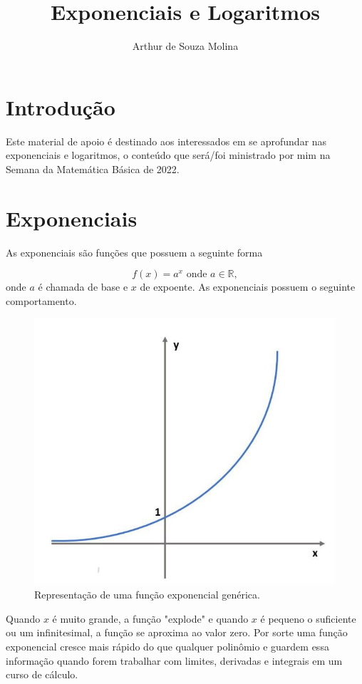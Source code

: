 \documentclass[10pt,a4paper]{article}
\title{Exponenciais e Logaritmos}
\author{Arthur de Souza Molina}
\begin{document}
	\maketitle
	\section{Introdução}
	Este material de apoio é destinado aos interessados em se aprofundar nas exponenciais e logaritmos, o conteúdo que será/foi ministrado por mim na Semana da Matemática Básica de 2022.
	
	\section{Exponenciais}
	As exponenciais são funções que possuem a seguinte forma
	
	\begin{equation}\nonumber
		f(x) = a^x\text{   onde   } a\in\mathbb{R},
	\end{equation}
	onde $ a $ é chamada de base e $ x $ de expoente. As exponenciais possuem o seguinte comportamento.
	\begin{figure}[h!]\label{exp1}
		\centering
		\includegraphics[width=0.7\linewidth]{expoencialgrafico1}
		\caption{Representação de uma função exponencial genérica.}
		\label{fig:expoencialgrafico1}
	\end{figure}
	Quando $ x $ é muito grande, a função "explode" e quando $ x $ é pequeno o suficiente ou um infinitesimal, a função se aproxima ao valor zero. Por sorte uma função exponencial cresce mais rápido do que qualquer polinômio e guardem essa informação quando forem trabalhar com limites, derivadas e integrais em um curso de cálculo.
	
\end{document}
